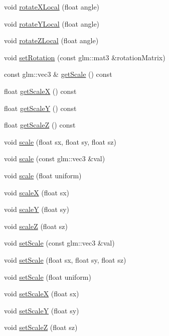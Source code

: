 \begin{DoxyCompactItemize}
void \mbox{\hyperlink{classec_1_1_transform3_d_a7124a324cea1d06b438248003d332ee2}{rotate\+X\+Local}} (float angle)
\item 
void \mbox{\hyperlink{classec_1_1_transform3_d_abfc79987e5fc4c805c5ff479d2c8b624}{rotate\+Y\+Local}} (float angle)
\item 
void \mbox{\hyperlink{classec_1_1_transform3_d_a9079ea3fc1c171f2e70fb489c804fc52}{rotate\+Z\+Local}} (float angle)
\item 
void \mbox{\hyperlink{classec_1_1_transform3_d_adc80d3f045c44c02bec2f2c1db2144db}{set\+Rotation}} (const glm\+::mat3 \&rotation\+Matrix)
\item 
const glm\+::vec3 \& \mbox{\hyperlink{classec_1_1_transform3_d_ab5f0e26d19bbb99a4624784d3024e654}{get\+Scale}} () const
\item 
float \mbox{\hyperlink{classec_1_1_transform3_d_a7ecc00577cd57f15ed63926a712cdcb1}{get\+ScaleX}} () const
\item 
float \mbox{\hyperlink{classec_1_1_transform3_d_a99763688e60bc36134390327344f5df0}{get\+ScaleY}} () const
\item 
float \mbox{\hyperlink{classec_1_1_transform3_d_ad79cc7092172c384e46b426059928672}{get\+ScaleZ}} () const
\item 
void \mbox{\hyperlink{classec_1_1_transform3_d_a3f4636cea71bac0aa965bc567e649e03}{scale}} (float sx, float sy, float sz)
\item 
void \mbox{\hyperlink{classec_1_1_transform3_d_a5ddb66479416948acf2406f544aaaa0f}{scale}} (const glm\+::vec3 \&val)
\item 
void \mbox{\hyperlink{classec_1_1_transform3_d_af4798de480a697351333d068a90ab69e}{scale}} (float uniform)
\item 
void \mbox{\hyperlink{classec_1_1_transform3_d_a3b859bc4f4b47e9d4b1e322c811a9e29}{scaleX}} (float sx)
\item 
void \mbox{\hyperlink{classec_1_1_transform3_d_a2b15e39c5a79379c361fb515a163c6de}{scaleY}} (float sy)
\item 
void \mbox{\hyperlink{classec_1_1_transform3_d_a61b556423d4c5dffd55f40685b0cb777}{scaleZ}} (float sz)
\item 
void \mbox{\hyperlink{classec_1_1_transform3_d_af8c2d1832acc0b0b52e217de4efa4d91}{set\+Scale}} (const glm\+::vec3 \&val)
\item 
void \mbox{\hyperlink{classec_1_1_transform3_d_a604f8cab4d669b713e04b57a7cc57c0c}{set\+Scale}} (float sx, float sy, float sz)
\item 
void \mbox{\hyperlink{classec_1_1_transform3_d_a2bdde49d328296d1a77586ee00f4bf4e}{set\+Scale}} (float uniform)
\item 
void \mbox{\hyperlink{classec_1_1_transform3_d_ada2c6aded239ad20e1c155a5dee60506}{set\+ScaleX}} (float sx)
\item 
void \mbox{\hyperlink{classec_1_1_transform3_d_a599ea97d84a88467abec94a30339f73e}{set\+ScaleY}} (float sy)
\item 
void \mbox{\hyperlink{classec_1_1_transform3_d_a1a71c829c953e5585623696fd7a4624d}{set\+ScaleZ}} (float sz)
\end{DoxyCompactItemize}

